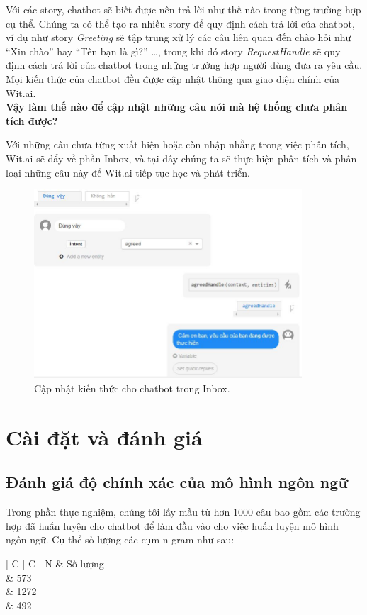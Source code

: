 \documentclass[12pt]{report}
\begin{document}
Với các story, chatbot sẽ biết được nên trả lời như thế nào trong từng trường hợp cụ thể. Chúng ta có thể tạo ra nhiều story để quy định cách trả lời của chatbot, ví dụ như story \textit{Greeting} sẽ tập trung xử lý các câu liên quan đến chào hỏi như ``Xin chào'' hay ``Tên bạn là gì?'' \ldots, trong khi đó story \textit{RequestHandle} sẽ quy định cách trả lời của chatbot trong những trường hợp người dùng đưa ra yêu cầu. Mọi kiến thức của chatbot đều được cập nhật thông qua giao diện chính của Wit.ai. \\[0.3mm]

\noindent \textbf{Vậy làm thế nào để cập nhật những câu nói mà hệ thống chưa phân tích được?\\[0.3cm]}

Với những câu chưa từng xuất hiện hoặc còn nhập nhằng trong việc phân tích, Wit.ai sẽ đẩy về phần Inbox, và tại đây chúng ta sẽ thực hiện phân tích và phân loại những câu này để Wit.ai tiếp tục học và phát triển.

\begin{figure}[H] \label{fig:inbox-wit}
	\centering
	\includegraphics[width=10cm]{Pics/Chap6/story.JPG}
	\caption{Cập nhật kiến thức cho chatbot trong Inbox.}
\end{figure}

\chapter{Cài đặt và đánh giá} \label{chap:setup}

\section{Đánh giá độ chính xác của mô hình ngôn ngữ}

Trong phần thực nghiệm, chúng tôi lấy mẫu từ hơn 1000 câu bao gồm các trường hợp đã huấn luyện cho chatbot để làm đầu vào cho việc huấn luyện mô hình ngôn ngữ. Cụ thể số lượng các cụm n-gram như sau:
\begin{table}[h]
	\caption{Số lượng các cụm n-gram trong tập huấn luyện}
	\centering
	\begin{tabular}{ | C | C | }
	\hline
	N & Số lượng \\
	 & 573 \\
	 & 1272 \\
	 & 492 \\
	\hline
	\end{tabular}
\end{table}
\end{document}
